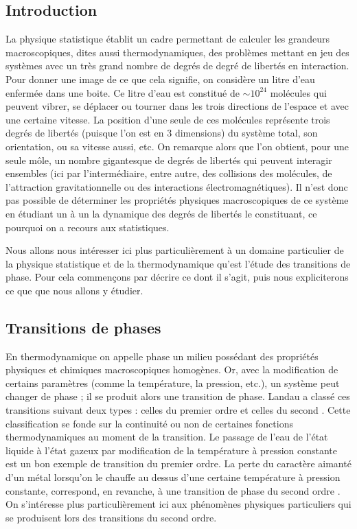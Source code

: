 \documentclass[10pt]{article}
\begin{document}
\pagebreak
\begin{multicols}{2}

\section{Introduction}

La physique statistique établit un cadre permettant de calculer les grandeurs macroscopiques, dites aussi thermodynamiques, des problèmes mettant en jeu des systèmes avec un très grand nombre de degrés de degré de libertés en interaction. Pour donner une image de ce que cela signifie, on considère un litre d'eau enfermée dans une boite. Ce litre d'eau est constitué de $\sim 10^{24}$ molécules qui peuvent vibrer, se déplacer ou tourner dans les trois directions de l'espace et avec une certaine vitesse. La position d'une seule de ces molécules représente trois degrés de libertés (puisque l'on est en 3 dimensions) du système total, son orientation, ou sa vitesse aussi, etc. On remarque alors que l'on obtient, pour une seule môle, un nombre gigantesque de degrés de libertés qui peuvent interagir ensembles (ici par l'intermédiaire, entre autre, des collisions des molécules, de l'attraction gravitationnelle ou des interactions électromagnétiques). Il n'est donc pas possible de déterminer les propriétés physiques macroscopiques de ce système en étudiant un à un la dynamique des degrés de libertés le constituant, ce pourquoi on a recours aux statistiques. 

Nous allons nous intéresser ici plus particulièrement à un domaine particulier de la physique statistique et de la thermodynamique qu'est l'étude des transitions de phase. Pour cela commençons par décrire ce dont il s'agit, puis nous expliciterons ce que que nous allons y étudier. \\


\subsection{Transitions de phases}

En thermodynamique on appelle phase un milieu possédant des propriétés physiques et chimiques macroscopiques homogènes. Or, avec la modification de certains paramètres (comme la température, la pression, etc.), un système peut changer de phase ; il se produit alors une transition de phase. Landau a classé ces transitions suivant deux types : celles du premier ordre et celles du second \cite{toledano1987landau}. Cette classification se fonde sur la continuité ou non de certaines fonctions thermodynamiques au moment de la transition. 
Le passage de l'eau de l'état liquide à l'état gazeux par modification de la température à pression constante est un bon exemple \cite{} de transition du premier ordre. La perte du caractère aimanté d'un métal lorsqu'on le chauffe au dessus d'une certaine température à pression constante, correspond, en revanche, à une transition de phase du second ordre \cite{kochmanski2013curie}. On s'intéresse plus particulièrement ici aux phénomènes physiques particuliers qui se produisent lors des transitions du second ordre. \\


\end{multicols}
\end{document}
